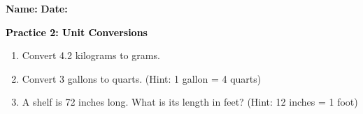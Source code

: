 \documentclass[12pt, letterpaper, fleqn]{article}
\begin{document}
\textbf{Name:} \underline{\hspace{5cm}}
\hfill
\textbf{Date:} \underline{\hspace{3cm}}\\

\begin{tcolorbox}[colback=customteal!20]
    \large\textcolor{black}{\textbf{Practice 2: Unit Conversions}}
\end{tcolorbox}
\begin{enumerate}[itemsep=3.5cm, leftmargin=0.6cm]
\item Convert 4.2 kilograms to grams.
\vspace{3.5cm}
\item Convert 3 gallons to quarts. (Hint: 1 gallon = 4 quarts)
\vspace{3.5cm}
\item A shelf is 72 inches long. What is its length in feet? (Hint: 12 inches = 1 foot)
\end{enumerate}
\end{document}
